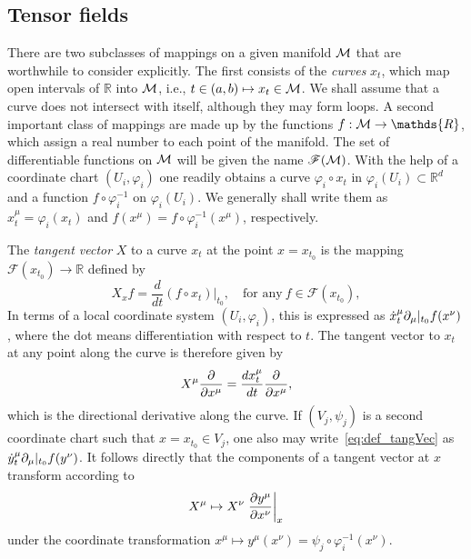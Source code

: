\documentclass[
final,
11pt,
a4paper,
DIV=11,
headinclude=true,
footinclude=false,
bibliography=totoc,
twoside=true,  %
BCOR=5mm
]{scrbook}
\begin{document}
\subsection{Tensor fields}

There are two subclasses of mappings on a given manifold $\mathcal{M}$ 
that are worthwhile to consider explicitly. The first consists of 
the \emph{curves} $x_t$, which map open intervals of $\mathds{R}$ 
into $\mathcal{M}$, i.e., $t \in (a,b) \mapsto x_t \in \mathcal{M}$. We 
shall assume that a curve does not intersect with itself, 
although they may form loops. A second important class of 
mappings are made up by the functions $f : \mc{M} \to 
\mathds{R}$, which assign a real number to each point of the 
manifold. The set of differentiable functions on $\mathcal{M}$ will be 
given the name $\mathscr{F}(\mathcal{M})$. With the help of a 
coordinate chart $(U_i,\varphi_i)$ one readily obtains a curve 
$\varphi_i \circ x_t$ in $\varphi_i(U_i) \subset \mathds{R}^d$ 
and a function $f \circ \varphi_i^{-1}$ on $\varphi_i(U_i)$. We 
generally shall write them as $x_t^\mu = \varphi_i(x_t)$ and 
$f(x^\mu) = f \circ \varphi_i^{-1}(x^\mu)$, respectively.

The \emph{tangent vector} $X$ to a curve $x_t$ at the point $x 
= x_{t_0}$ is the mapping $\mathscr{F}(x_{t_0}) \to \mathds{R}$ 
defined by
\begin{equation}
\label{eq:def_tangVec}
  X_x f = \frac{d}{dt}(f\circ x_t)|_{t_0},\quad
  \text{for any}~f\in\mathscr{F}(x_{t_0}),
\end{equation}
In terms of a local coordinate system $(U_i,\varphi_i)$, this is 
expressed as $\dot{x}_t^\mu\partial_\mu|_{t_0}f(x^\nu)$, where the dot 
means differentiation with respect to $t$. The tangent vector to 
$x_t$ at any point along the curve is therefore given by
\begin{equation}
\label{eq:tangVec_coor}
  X^\mu \frac{\partial}{\partial x^\mu} = \frac{dx_t^\mu}{dt} 
  \frac{\partial}{\partial x^\mu},
\end{equation}
which is the directional derivative along the curve. If 
$(V_j,\psi_j)$ is a second coordinate chart such that $x = 
x_{t_0} \in V_j$, one also may write~\eqref{eq:def_tangVec} as 
$\dot{y}_t^\mu\partial_\mu|_{t_0}f(y^\nu)$. It follows directly that 
the components of a tangent vector at $x$
transform according to
\begin{equation*}
  X^\mu \mapsto X^\nu \left.\frac{\partial y^\mu}{\partial 
      x^\nu}\right|_{x}
\end{equation*}
under the coordinate transformation $x^\mu \mapsto y^\mu(x^\nu) = 
\psi_j\circ\varphi_i^{-1}(x^\nu)$. 
\end{document}
